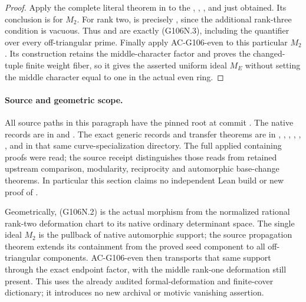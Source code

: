 \begin{proof}
Apply the complete literal theorem
 in
 to the
, , ,
 and  just obtained.
Its conclusion is  for \(M_2\).
For rank two,  is precisely
, since the additional rank-three
condition is vacuous. Thus 
and  are exactly (G106N.3),
including the quantifier over every off-triangular
prime. Finally apply AC-G106-even to this
particular \(M_2\). Its construction retains
the middle-character factor and proves the
changed-tuple finite weight fiber, so it gives
the asserted uniform ideal \(M_E\) without
setting the middle character equal to one in
the actual even ring.
\end{proof}

\paragraph{Source and geometric scope.}
All source paths in this paragraph have the pinned root
at commit
.
The native records are in
and .
The exact generic records and transfer theorems are in
,
,
, ,
, ,
 and 
in that same curve-specialization directory.
The full applied containing proofs were read; the
source receipt distinguishes those reads from retained
upstream comparison, modularity, reciprocity and
automorphic base-change theorems. In particular this
section claims no independent Lean build or new proof
of .

Geometrically, (G106N.2) is the actual morphism from the
normalized rational rank-two deformation chart to its
native ordinary determinant space. The single ideal
\(M_2\) is the pullback of native automorphic support;
the source propagation theorem extends its containment
from the proved seed component to all off-triangular
components. AC-G106-even then transports that same
support through the exact endpoint factor, with the
middle rank-one deformation still present. This uses
the already audited formal-deformation and finite-cover
dictionary; it introduces no new archival or motivic
vanishing assertion.



